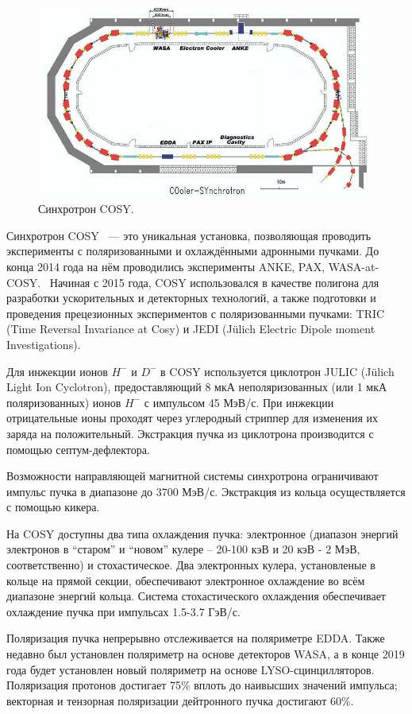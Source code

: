 
\begin{figure}[h]
	\centering
	\includegraphics[scale=.5]{images/chapter4/800px-COSY_Ring}
	\caption{Синхротрон COSY.\label{fig:COSY_Ring}}
\end{figure}

Синхротрон COSY~\cite{COSY-Ring} --- это уникальная установка, позволяющая проводить эксперименты с
поляризованными и охлаждёнными адронными пучками. До конца 2014 года на нём проводились эксперименты
ANKE, PAX, WASA-at-COSY.~\cite{FZJ:Experiments} Начиная с 2015 года, COSY использовался в качестве
полигона для разработки ускорительных и детекторных технологий, а также подготовки и проведения
прецезионных экспериментов с поляризованными пучками: TRIC (Time Reversal Invariance at Cosy) и
JEDI (J\"ulich Electric Dipole moment Investigations).

Для инжекции ионов $H^-$ и $D^-$ в COSY  используется циклотрон JULIC (J\"ulich Light Ion Cyclotron), предоставляющий 8 мкА неполяризованных (или 1 мкА поляризованных) ионов $H^-$ с импульсом 45 МэВ/с. При инжекции отрицательные ионы проходят через углеродный стриппер для изменения их заряда на положительный. Экстракция пучка из циклотрона производится с помощью септум-дефлектора.~\cite{JULIC-Injector}

Возможности направляющей магнитной системы синхротрона ограничивают импульс пучка в диапазоне до 3700 МэВ/с. Экстракция из кольца осуществляется с помощью кикера.

На COSY доступны два типа охлаждения пучка: электронное (диапазон энергий электронов в ``старом'' и ``новом'' кулере -- 20-100 кэВ и 20 кэВ - 2 МэВ, соответственно) и стохастическое. 
%
Два электронных кулера, установленые в кольце на прямой секции, обеспечивают электронное охлаждение во всём диапазоне энергий кольца. Система стохастического охлаждения обеспечивает охлаждение пучка при импульсах 1.5-3.7 ГэВ/с.

Поляризация пучка непрерывно отслеживается на поляриметре  EDDA. Также недавно был установлен поляриметр на основе детекторов WASA, а в конце 2019 года будет установлен новый поляриметр на основе LYSO-сцинцилляторов.
Поляризация протонов достигает 75\% вплоть до наивысших значений импульса; векторная и тензорная поляризации дейтронного пучка достигают 60\%.
